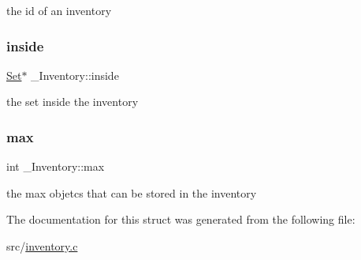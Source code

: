 the id of an inventory \mbox{\label{struct__Inventory_ab6ad3d65f6119379be87edf22db640cb}} 
\subsubsection{\texorpdfstring{inside}{inside}}
{\footnotesize\ttfamily \hyperlink{set_8h_a6d3b7f7c92cbb4577ef3ef7ddbf93161}{Set}$\ast$ \+\_\+\+Inventory\+::inside}

the set inside the inventory \mbox{\label{struct__Inventory_ac09bcf212b2c7ff348066b2e5f28bb9c}} 
\subsubsection{\texorpdfstring{max}{max}}
{\footnotesize\ttfamily int \+\_\+\+Inventory\+::max}

the max objetcs that can be stored in the inventory 

The documentation for this struct was generated from the following file\+:\begin{DoxyCompactItemize}
\item 
src/\hyperlink{inventory_8c}{inventory.\+c}\end{DoxyCompactItemize}
